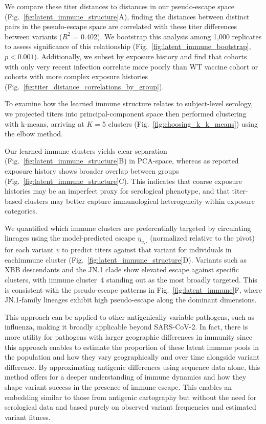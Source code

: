 \documentclass[11pt,oneside,letterpaper]{article}
\begin{document}
We compare these titer distances to distances in our pseudo-escape space (Fig.~\ref{fig:latent_immune_structure}A), finding the distances between distinct pairs in the pseudo-escape space are correlated with these titer differences between variants ($R^2$ = 0.402).
We bootstrap this analysis among 1,000 replicates to assess significance of this relationship (Fig.~\ref{fig:latent_immune_bootstrap}, $p < 0.001$).
Additionally, we subset by exposure history and find that cohorts with only very recent infection correlate more poorly than WT vaccine cohort or cohorts with more complex exposure histories (Fig.~\ref{fig:titer_distance_correlations_by_group}).

To examine how the learned immune structure relates to subject-level serology, we projected titers into principal-component space then performed clustering with k-means, arriving at $K=5$ clusters (Fig.~\ref{fig:choosing_k_k_means}) using the elbow method.

Our learned immune clusters yields clear separation (Fig.~\ref{fig:latent_immune_structure}B) in PCA-space, whereas as reported exposure history shows broader overlap between groups (Fig.~\ref{fig:latent_immune_structure}C).
This indicates that coarse exposure histories may be an imperfect proxy for serological phenotype, and that titer-based clusters may better capture immunological heterogeneity within exposure categories.


We quantified which immune clusters are preferentially targeted by circulating lineages using the model-predicted escape $\eta_{v,\cdot}$ (normalized relative to the pivot) for each variant $v$ to predict titers against that variant for individuals in eachimmune cluster (Fig.~\ref{fig:latent_immune_structure}D).
Variants such as XBB descendants and the JN.1 clade show elevated escape against specific clusters, with immune cluster~4 standing out as the most broadly targeted.
This is consistent with the pseudo-escape patterns in Fig.~\ref{fig:latent_immune}F, where JN.1-family lineages exhibit high pseudo-escape along the dominant dimensions.


This approach can be applied to other antigenically variable pathogens, such as influenza, making it broadly applicable beyond SARS-CoV-2.
In fact, there is more utility for pathogens with larger geographic differences in immunity since this approach enables to estimate the proportion of these latent immune pools in the population and how they vary geographically and over time alongside variant difference.
By approximating antigenic differences using sequence data alone, this method offers for a deeper understanding of immune dynamics and how they shape variant success in the presence of immune escape.
This enables an embedding similar to those from antigenic cartography but without the need for serological data and based purely on observed variant frequencies and estimated variant fitness.
\end{document}
